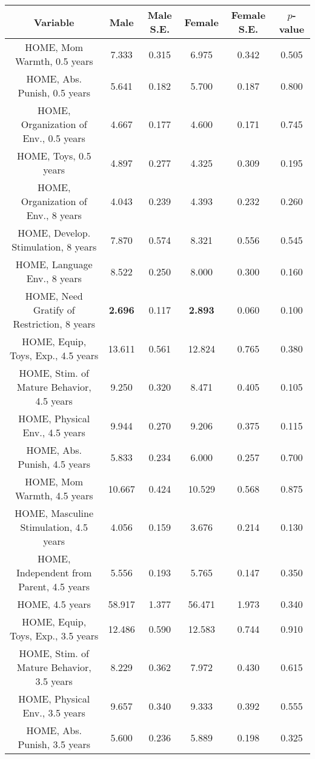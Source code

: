 \begin{tabular}{c c c c c c}
\toprule
\textbf{Variable} & \textbf{Male} & \textbf{Male S.E.}  & \textbf{Female} & \textbf{Female S.E.} & \textbf{$ p $-value} \\
\midrule
HOME, Mom Warmth, 0.5 years & 7.333 & 0.315 &  6.975 & 0.342 & 0.505 \\
HOME, Abs. Punish, 0.5 years & 5.641 & 0.182 &  5.700 & 0.187 & 0.800 \\
HOME, Organization of Env., 0.5 years & 4.667 & 0.177 &  4.600 & 0.171 & 0.745 \\
HOME, Toys, 0.5 years & 4.897 & 0.277 &  4.325 & 0.309 & 0.195 \\
HOME, Organization of Env., 8 years & 4.043 & 0.239 &  4.393 & 0.232 & 0.260 \\
HOME, Develop. Stimulation, 8 years & 7.870 & 0.574 &  8.321 & 0.556 & 0.545 \\
HOME, Language Env., 8 years & 8.522 & 0.250 &  8.000 & 0.300 & 0.160 \\
HOME, Need Gratify of Restriction, 8 years & \textbf{2.696} & 0.117 &  \textbf{2.893} & 0.060 & 0.100 \\
HOME, Equip, Toys, Exp., 4.5 years & 13.611 & 0.561 &  12.824 & 0.765 & 0.380 \\
HOME, Stim. of Mature Behavior, 4.5 years & 9.250 & 0.320 &  8.471 & 0.405 & 0.105 \\
HOME, Physical Env., 4.5 years & 9.944 & 0.270 &  9.206 & 0.375 & 0.115 \\
HOME, Abs. Punish, 4.5 years & 5.833 & 0.234 &  6.000 & 0.257 & 0.700 \\
HOME, Mom Warmth, 4.5 years & 10.667 & 0.424 &  10.529 & 0.568 & 0.875 \\
HOME, Masculine Stimulation, 4.5 years & 4.056 & 0.159 &  3.676 & 0.214 & 0.130 \\
HOME, Independent from Parent, 4.5 years & 5.556 & 0.193 &  5.765 & 0.147 & 0.350 \\
HOME, 4.5 years & 58.917 & 1.377 &  56.471 & 1.973 & 0.340 \\
HOME, Equip, Toys, Exp., 3.5 years & 12.486 & 0.590 &  12.583 & 0.744 & 0.910 \\
HOME, Stim. of Mature Behavior, 3.5 years & 8.229 & 0.362 &  7.972 & 0.430 & 0.615 \\
HOME, Physical Env., 3.5 years & 9.657 & 0.340 &  9.333 & 0.392 & 0.555 \\
HOME, Abs. Punish, 3.5 years & 5.600 & 0.236 &  5.889 & 0.198 & 0.325 \\

\end{tabular}
